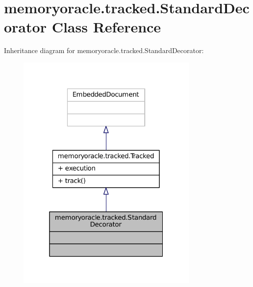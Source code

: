 \hypertarget{classmemoryoracle_1_1tracked_1_1StandardDecorator}{}\section{memoryoracle.\+tracked.\+Standard\+Decorator Class Reference}
\label{classmemoryoracle_1_1tracked_1_1StandardDecorator}


Inheritance diagram for memoryoracle.\+tracked.\+Standard\+Decorator\+:
\nopagebreak
\begin{figure}[H]
\begin{center}
\leavevmode
\includegraphics[width=253pt]{classmemoryoracle_1_1tracked_1_1StandardDecorator__inherit__graph}
\end{center}
\end{figure}


